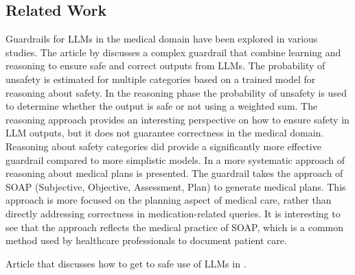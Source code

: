 %

\subsection{Related Work}
Guardrails for LLMs in the medical domain have been explored in various studies.
The article by \citep{kang2024r} discusses a complex guardrail that combine learning and reasoning to ensure safe and correct outputs from LLMs.
The probability of unsafety is estimated for multiple categories based on a trained model for reasoning about safety.
In the reasoning phase the probability of unsafety is used to determine whether the output is safe or not using a weighted sum.
The reasoning approach provides an interesting perspective on how to ensure safety in LLM outputs, but it does not guarantee correctness in the medical domain.
Reasoning about safety categories did provide a significantly more effective guardrail compared to more simplistic models.
In \citep{hsu2025medplan} a more systematic approach of reasoning about medical plans is presented.
The guardrail takes the approach of SOAP (Subjective, Objective, Assessment, Plan) to generate medical plans.
This approach is more focused on the planning aspect of medical care, rather than directly addressing correctness in medication-related queries.
It is interesting to see that the approach reflects the medical practice of SOAP, which is a common method used by healthcare professionals to document patient care.

Article that discusses how to get to safe use of LLMs in \citep{wu2024medical}.

